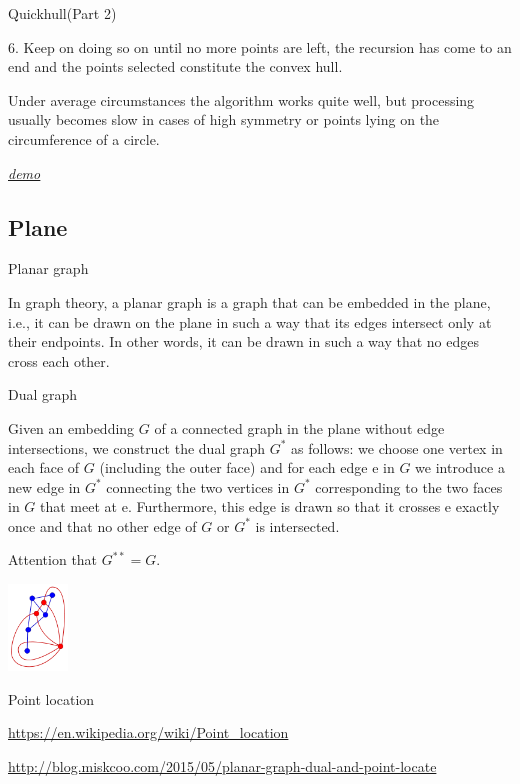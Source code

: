 \documentclass[UTF8]{beamer}
\begin{document}
	\begin{frame}{Quickhull(Part 2)}

	6. Keep on doing so on until no more points are left, the recursion has come to an end and the points selected constitute the convex hull.

	Under average circumstances the algorithm works quite well, but processing usually becomes slow in cases of high symmetry or points lying on the circumference of a circle.

	\href{Quickhull.gif}{\emph{\underline{demo}}}

	\end{frame}

	\subsection{Plane}

	\begin{frame}{Planar graph}

	In graph theory, a planar graph is a graph that can be embedded in the plane, i.e., it can be drawn on the plane in such a way that its edges intersect only at their endpoints. In other words, it can be drawn in such a way that no edges cross each other.

	\end{frame}

	\begin{frame}{Dual graph}

	Given an embedding $G$ of a connected graph in the plane without edge intersections, we construct the dual graph $G^{*}$ as follows: we choose one vertex in each face of $G$ (including the outer face) and for each edge e in $G$ we introduce a new edge in $G^{*}$ connecting the two vertices in $G^{*}$ corresponding to the two faces in $G$ that meet at e. Furthermore, this edge is drawn so that it crosses e exactly once and that no other edge of $G$ or $G^{*}$ is intersected.

	Attention that $G^{**} = G$.

	\includegraphics[height=2.3cm]{Dual_graph.png}

	\end{frame}

	\begin{frame}{Point location}

	\url{https://en.wikipedia.org/wiki/Point_location}

	\url{http://blog.miskcoo.com/2015/05/planar-graph-dual-and-point-locate}

	\end{frame}
\end{document}
